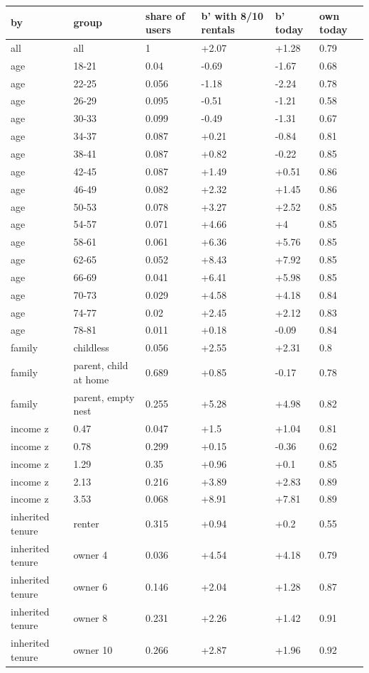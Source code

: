 \begingroup\small
\setlength{\tabcolsep}{3pt}
\renewcommand{\arraystretch}{1.04}
\begin{tabularx}{\linewidth}{XXXXXX}
\toprule
by & group & share of users & b' with 8/10 rentals & b' today & own today \\
\midrule
all & all & 1 & +2.07 & +1.28 & 0.79 \\
age & 18-21 & 0.04 & -0.69 & -1.67 & 0.68 \\
age & 22-25 & 0.056 & -1.18 & -2.24 & 0.78 \\
age & 26-29 & 0.095 & -0.51 & -1.21 & 0.58 \\
age & 30-33 & 0.099 & -0.49 & -1.31 & 0.67 \\
age & 34-37 & 0.087 & +0.21 & -0.84 & 0.81 \\
age & 38-41 & 0.087 & +0.82 & -0.22 & 0.85 \\
age & 42-45 & 0.087 & +1.49 & +0.51 & 0.86 \\
age & 46-49 & 0.082 & +2.32 & +1.45 & 0.86 \\
age & 50-53 & 0.078 & +3.27 & +2.52 & 0.85 \\
age & 54-57 & 0.071 & +4.66 & +4 & 0.85 \\
age & 58-61 & 0.061 & +6.36 & +5.76 & 0.85 \\
age & 62-65 & 0.052 & +8.43 & +7.92 & 0.85 \\
age & 66-69 & 0.041 & +6.41 & +5.98 & 0.85 \\
age & 70-73 & 0.029 & +4.58 & +4.18 & 0.84 \\
age & 74-77 & 0.02 & +2.45 & +2.12 & 0.83 \\
age & 78-81 & 0.011 & +0.18 & -0.09 & 0.84 \\
family & childless & 0.056 & +2.55 & +2.31 & 0.8 \\
family & parent, child at home & 0.689 & +0.85 & -0.17 & 0.78 \\
family & parent, empty nest & 0.255 & +5.28 & +4.98 & 0.82 \\
income z & 0.47 & 0.047 & +1.5 & +1.04 & 0.81 \\
income z & 0.78 & 0.299 & +0.15 & -0.36 & 0.62 \\
income z & 1.29 & 0.35 & +0.96 & +0.1 & 0.85 \\
income z & 2.13 & 0.216 & +3.89 & +2.83 & 0.89 \\
income z & 3.53 & 0.068 & +8.91 & +7.81 & 0.89 \\
inherited tenure & renter & 0.315 & +0.94 & +0.2 & 0.55 \\
inherited tenure & owner 4 & 0.036 & +4.54 & +4.18 & 0.79 \\
inherited tenure & owner 6 & 0.146 & +2.04 & +1.28 & 0.87 \\
inherited tenure & owner 8 & 0.231 & +2.26 & +1.42 & 0.91 \\
inherited tenure & owner 10 & 0.266 & +2.87 & +1.96 & 0.92 \\
\bottomrule
\end{tabularx}
\endgroup
